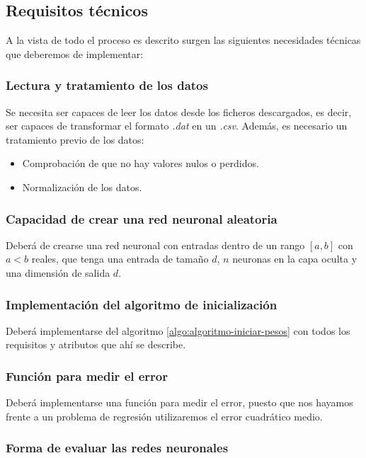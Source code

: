 \subsection{Requisitos técnicos}  

A la vista de todo el proceso es descrito surgen las siguientes necesidades técnicas que deberemos de implementar:  

\subsubsection{Lectura y tratamiento de los datos}

Se necesita ser capaces de leer los datos desde los ficheros descargados, es decir, ser capaces de transformar el formato \textit{.dat} en un \textit{.csv}. 
Además, es necesario un tratamiento previo de los datos: 
\begin{itemize}
    \item Comprobación de que no hay valores nulos o perdidos. 
    \item Normalización de los datos. 
\end{itemize}


\subsubsection{Capacidad de crear una red neuronal aleatoria}  

Deberá de crearse una red neuronal con entradas dentro de un rango $[a,b]$ con $a < b$ reales,
que tenga una entrada de tamaño $d$,
$n$ neuronas en la capa oculta y
una dimensión de salida $d$.

\subsubsection{Implementación del algoritmo de inicialización}

Deberá implementarse del algoritmo  \ref{algo:algoritmo-iniciar-pesos} con todos los requisitos y atributos que ahí se describe.  

\subsubsection{Función para medir el error}

Deberá implementarse una función para medir el
 error, puesto que nos hayamos frente a un problema de regresión utilizaremos el error cuadrático medio. 

\subsubsection{Forma de evaluar las redes neuronales}  

